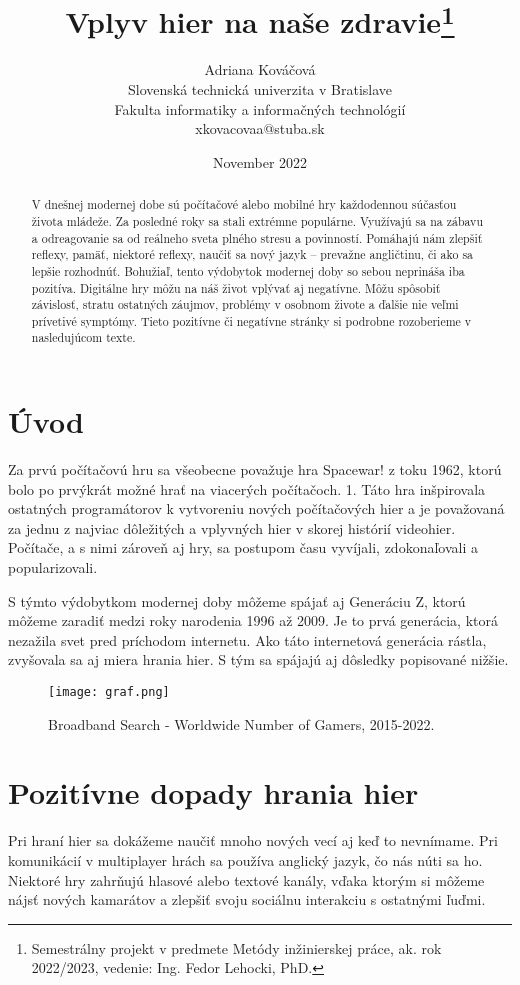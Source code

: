 \documentclass[10pt,twoside,slovak,a4paper]{article}
\title{Vplyv hier na naše zdravie\thanks{Semestrálny projekt v predmete Metódy inžinierskej práce, ak. rok 2022/2023, vedenie: Ing. Fedor Lehocki, PhD.}}
\author{Adriana Kováčová\\
	{\small Slovenská technická univerzita v Bratislave}\\
	{\small Fakulta informatiky a informačných technológií}\\
	{\small {xkovacovaa@stuba.sk}}
	}
\date{November 2022}
\begin{document}
\maketitle


\begin{abstract}
V dnešnej modernej dobe sú počítačové alebo mobilné hry každodennou súčasťou života mládeže. Za posledné roky sa stali extrémne populárne. Využívajú sa na zábavu a odreagovanie sa od reálneho sveta plného stresu a povinností. Pomáhajú nám zlepšiť reflexy, pamäť, niektoré reflexy, naučiť sa nový jazyk – prevažne angličtinu, či ako sa lepšie rozhodnúť. Bohužiaľ, tento výdobytok modernej doby so sebou neprináša iba pozitíva.
Digitálne hry môžu na náš život vplývať aj negatívne. Môžu spôsobiť závislosť, stratu ostatných záujmov, problémy v osobnom živote a ďalšie nie veľmi prívetivé symptómy. Tieto pozitívne či negatívne stránky si podrobne rozoberieme v nasledujúcom texte.
\end{abstract}


\section{Úvod}

Za prvú počítačovú hru sa všeobecne považuje hra Spacewar! z toku 1962, ktorú bolo po prvýkrát možné hrať na viacerých počítačoch. 1. Táto hra inšpirovala ostatných programátorov k vytvoreniu nových počítačových hier a je považovaná za jednu z najviac dôležitých a vplyvných hier v skorej histórií videohier. Počítače, a s nimi zároveň aj hry, sa postupom času vyvíjali, zdokonaľovali a popularizovali. 

S týmto výdobytkom modernej doby môžeme spájať aj Generáciu Z, ktorú môžeme zaradiť medzi roky narodenia 1996 až 2009. Je to prvá generácia, ktorá nezažila svet pred príchodom internetu. Ako táto internetová generácia rástla, zvyšovala sa aj miera hrania hier. S tým sa spájajú aj dôsledky popisované nižšie.

\begin{figure}
\texttt{[image: graf.png]}
\caption{Broadband Search - Worldwide Number of Gamers, 2015-2022. \cite{graph}}
\end{figure}


\section{Pozitívne dopady hrania hier}
Pri hraní hier sa dokážeme naučiť mnoho nových vecí aj keď to nevnímame.  Pri komunikácií v multiplayer hrách sa používa anglický jazyk, čo nás núti sa ho. Niektoré hry zahrňujú hlasové alebo textové kanály, vďaka ktorým si môžeme nájsť nových kamarátov a zlepšiť svoju sociálnu interakciu s ostatnými ľuďmi.
\end{document}
